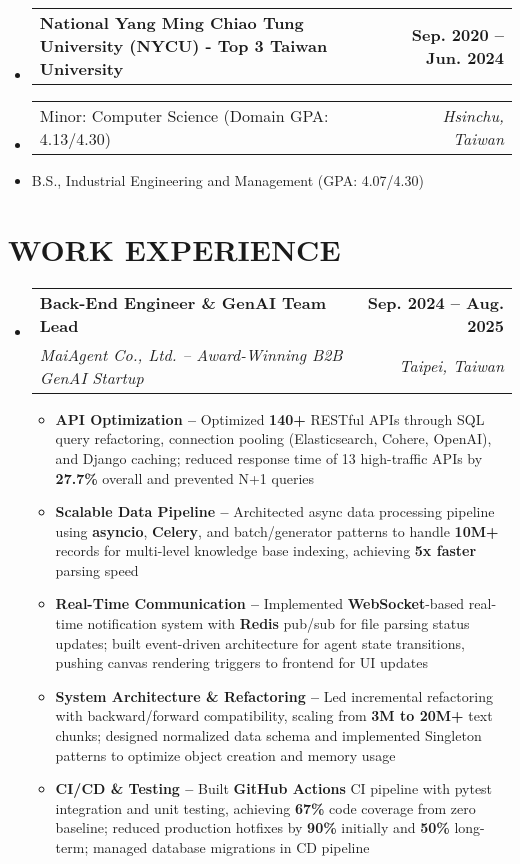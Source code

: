 \documentclass[letterpaper,11pt]{article}
\makeatletter
\newcommand{\resumeItem}[1]{
  \item\small{#1}
}
\newcommand{\resumeSubheadingnull}[2]{
  \item
    \begin{tabular*}{1.0\textwidth}[t]{l@{\extracolsep{\fill}}r}
      \textbf{#1} & \textbf{\small #2} \\
    \end{tabular*}\vspace{3pt}
}
\newcommand{\resumeSubheadinga}[4]{
  \vspace{-3pt}\item
    \begin{tabular*}{1.0\textwidth}[t]{l@{\extracolsep{\fill}}r}
      \textbf{#1} & \textbf{\small #2} \\
      \textit{\small#3} & \textit{\small #4} \\
    \end{tabular*}
}
\newcommand{\resumeSubItema}[2]{
  \item
    \begin{tabular*}{1.0\textwidth}[t]{l@{\extracolsep{\fill}}r}
      \small#1 & \textit{\small #2} \\
    \end{tabular*}
}
\newcommand{\resumeSubItem}[1]{\resumeItem{#1}}
\newcommand{\resumeSubHeadingListStart}{\begin{itemize}[leftmargin=0.0in, label={}]}
\newcommand{\resumeSubHeadingListEnd}{\end{itemize}}
\newcommand{\resumeItemListStart}{\begin{itemize}[label=$\vcenter{\hbox{\tiny$\bullet$}}$]}
\newcommand{\resumeItemListEnd}{\end{itemize}}
\makeatother
\begin{document}
\resumeSubHeadingListStart
\resumeSubheadingnull
{National Yang Ming Chiao Tung University (NYCU) - Top 3 Taiwan University }{Sep. 2020 -- Jun. 2024}
\vspace{-20pt}
\resumeSubItema{Minor: Computer Science (Domain GPA: 4.13/4.30)}{Hsinchu, Taiwan}
\vspace{-15pt}
\resumeSubItem{B.S., Industrial Engineering and Management (GPA: 4.07/4.30)}
\resumeSubHeadingListEnd

\vspace{-6pt}



\section{WORK EXPERIENCE}
\vspace{2pt}
\resumeSubHeadingListStart
\resumeSubheadinga
{Back-End Engineer \& GenAI Team Lead}{Sep. 2024 -- Aug. 2025}
{MaiAgent Co., Ltd. -- Award-Winning B2B GenAI Startup}{Taipei, Taiwan}
\vspace{-6pt}
\resumeItemListStart
\resumeItem{\textbf{API Optimization --} Optimized \textbf{140+} RESTful APIs through SQL query refactoring, connection pooling (Elasticsearch, Cohere, OpenAI), and Django caching; reduced response time of 13 high-traffic APIs by \textbf{27.7\%} overall and prevented N+1 queries}
\resumeItem{\textbf{Scalable Data Pipeline --} Architected async data processing pipeline using \textbf{asyncio}, \textbf{Celery}, and batch/generator patterns to handle \textbf{10M+} records for multi-level knowledge base indexing, achieving \textbf{5x faster} parsing speed}
\resumeItem{\textbf{Real-Time Communication --} Implemented \textbf{WebSocket}-based real-time notification system with \textbf{Redis} pub/sub for file parsing status updates; built event-driven architecture for agent state transitions, pushing canvas rendering triggers to frontend for UI updates}
\resumeItem{\textbf{System Architecture \& Refactoring --} Led incremental refactoring with backward/forward compatibility, scaling from \textbf{3M to 20M+} text chunks; designed normalized data schema and implemented Singleton patterns to optimize object creation and memory usage}
\resumeItem{\textbf{CI/CD \& Testing --} Built \textbf{GitHub Actions} CI pipeline with pytest integration and unit testing, achieving \textbf{67\%} code coverage from zero baseline; reduced production hotfixes by \textbf{90\%} initially and \textbf{50\%} long-term; managed database migrations in CD pipeline}
\resumeItemListEnd
\resumeSubHeadingListEnd
\end{document}
